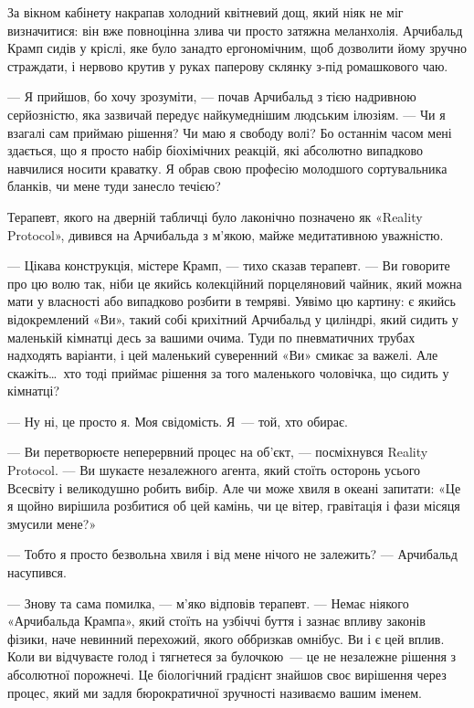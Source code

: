 \documentclass[12pt, a4paper, openany]{book}
\begin{document}
\begin{realitybox}
За вікном кабінету накрапав холодний квітневий дощ, який ніяк не міг визначитися: він вже повноцінна злива чи просто затяжна меланхолія. Арчибальд Крамп сидів у кріслі, яке було занадто ергономічним, щоб дозволити йому зручно страждати, і нервово крутив у руках паперову склянку з-під ромашкового чаю.

--- Я прийшов, бо хочу зрозуміти, --- почав Арчибальд з тією надривною серйозністю, яка зазвичай передує найкумеднішим людським ілюзіям. --- Чи я взагалі сам приймаю рішення? Чи маю я свободу волі? Бо останнім часом мені здається, що я просто набір біохімічних реакцій, які абсолютно випадково навчилися носити краватку. Я обрав свою професію молодшого сортувальника бланків, чи мене туди занесло течією?

\medskip
Терапевт, якого на дверній табличці було лаконічно позначено як «Reality Protocol», дивився на Арчибальда з м'якою, майже медитативною уважністю.

--- Цікава конструкція, містере Крамп, --- тихо сказав терапевт. --- Ви говорите про цю волю так, ніби це якийсь колекційний порцеляновий чайник, який можна мати у власності або випадково розбити в темряві. Уявімо цю картину: є якийсь відокремлений «Ви», такий собі крихітний Арчибальд у циліндрі, який сидить у маленькій кімнатці десь за вашими очима. Туди по пневматичних трубах надходять варіанти, і цей маленький суверенний «Ви» смикає за важелі. Але скажіть\ldots\ хто тоді приймає рішення за того маленького чоловічка, що сидить у кімнатці?

--- Ну ні, це просто я. Моя свідомість. Я~--- той, хто обирає.

--- Ви перетворюєте неперервний процес на об'єкт, --- посміхнувся Reality Protocol. --- Ви шукаєте незалежного агента, який стоїть осторонь усього Всесвіту і великодушно робить вибір. Але чи може хвиля в океані запитати: «Це я щойно вирішила розбитися об цей камінь, чи це вітер, гравітація і фази місяця змусили мене?»

--- Тобто я просто безвольна хвиля і від мене нічого не залежить? --- Арчибальд насупився.

--- Знову та сама помилка, --- м'яко відповів терапевт. --- Немає ніякого «Арчибальда Крампа», який стоїть на узбіччі буття і зазнає впливу законів фізики, наче невинний перехожий, якого оббризкав омнібус. Ви і є цей вплив. Коли ви відчуваєте голод і тягнетеся за булочкою~--- це не незалежне рішення з абсолютної порожнечі. Це біологічний градієнт знайшов своє вирішення через процес, який ми задля бюрократичної зручності називаємо вашим іменем.


\end{realitybox}
\end{document}
